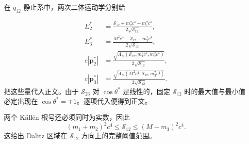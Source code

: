 \begin{derivation}
在 $q_{12}$ 静止系中，两次二体运动学分别给

\begin{align*}
E_2^*
&=\frac{\mathcal S_{12}+m_2^2c^4-m_1^2c^4}{2\sqrt{\mathcal S_{12}}},\\
E_3^*
&=\frac{M^2c^4-\mathcal S_{12}-m_3^2c^4}{2\sqrt{\mathcal S_{12}}},\\
c|\mathbf p_2^*|
&=\frac{\sqrt{\Lambda_K(\mathcal S_{12},m_1^2c^4,m_2^2c^4)}}{2\sqrt{\mathcal S_{12}}},\\
c|\mathbf p_3^*|
&=\frac{\sqrt{\Lambda_K(M^2c^4,\mathcal S_{12},m_3^2c^4)}}{2\sqrt{\mathcal S_{12}}}.
\end{align*}
把这些量代入正文。由于 $\mathcal S_{23}$ 对 $\cos\theta^*$ 是线性的，固定 $\mathcal S_{12}$ 时的最大值与最小值必定出现在 $\cos\theta^*=\mp1$。逐项代入便得到正文。

两个 Källén 根号还必须同时为实数，因此
\begin{equation*}
(m_1+m_2)^2c^4
\le\mathcal S_{12}
\le(M-m_3)^2c^4.
\end{equation*}
这给出 Dalitz 区域在 $\mathcal S_{12}$ 方向上的完整阈值范围。
\end{derivation}
